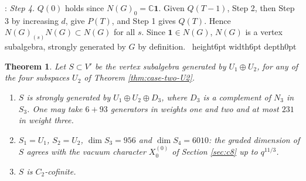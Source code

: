\documentclass[leqno]{article}
\newcommand{\Cbb}{\ensuremath{\mathbb{C}}}
\newcommand{\qed}{\hfill \vrule height6pt  width6pt depth0pt}
\newtheorem{thm}{Theorem}[section]
\newenvironment{proof}[1][]{\noindent {\it Proof #1} : }{\hbox{~}\qed
\smallskip
}
\numberwithin{equation}{section}
\begin{document}
\begin{proof}
\emph{Step 4.} $Q(0)$ holds since $N(G)_0 = \Cbb\mathbf 1$. Given $Q(T-1)$, Step 2, then Step 3 by increasing $d$, give $P(T)$, and Step 1 gives $Q(T)$. Hence $N(G)_{(s)}N(G) \subset N(G)$ for all $s$. Since $\mathbf 1 \in N(G)$, $N(G)$ is a vertex subalgebra, strongly generated by $G$ by definition.
\end{proof}

\begin{thm}
\label{thm:strong-generation}
Let $S \subset V'$ be the vertex subalgebra generated by $U_1 \oplus U_2$, for any of the four subspaces $U_2$ of Theorem \ref{thm:case-two-U2}.
\begin{enumerate}
\item $S$ is strongly generated by $U_1 \oplus U_2 \oplus D_3$, where $D_3$ is a complement of $N_3$ in $S_3$. One may take $6 + 93$ generators in weights one and two and at most $231$ in weight three.
\item $S_1 = U_1$, $S_2 = U_2$, $\dim S_3 = 956$ and $\dim S_4 = 6010$: the graded dimension of $S$ agrees with the vacuum character $X^{(0)}_0$ of Section \ref{sec:c8} up to $q^{11/3}$.
\item $S$ is $C_2$-cofinite.
\end{enumerate}
\end{thm}
\end{document}
